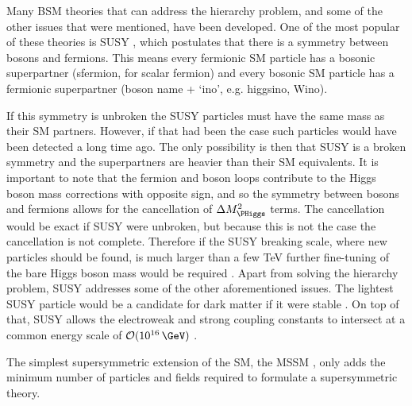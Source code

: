 Many \acf{BSM} theories that can address the hierarchy problem, and some of
the other issues that were mentioned, have been developed.
One of the most
popular of these theories is \acf{SUSY} \cite{SUSY-primer}, which postulates
that there is a symmetry between bosons and fermions. This means every fermionic
\ac{SM} particle has a bosonic superpartner (sfermion, for scalar fermion)
and every bosonic \ac{SM} particle
has a fermionic superpartner (boson name + `ino', e.g. higgsino, Wino).

If this symmetry is unbroken the \ac{SUSY} particles must
have the same mass as their \ac{SM} partners. However, if that had 
been the case such particles would have been detected a long time ago. The 
only possibility is then that \ac{SUSY} is a broken symmetry and the superpartners
are heavier than their \ac{SM} equivalents. It is important to note
that the fermion and boson loops contribute to the Higgs boson
mass corrections with opposite sign, and so the symmetry between bosons and fermions 
allows for the cancellation of $\Delta M_{\PHiggs}^2$ terms. The cancellation
would be exact if \ac{SUSY} were unbroken, but because this is not the case the
cancellation is not complete. Therefore if the \ac{SUSY} breaking scale, where
new particles should be found, is much larger than a few TeV further fine-tuning of
the bare Higgs boson mass would be required \cite{MSSM-carena-haber,SUSY-primer}.
Apart from solving the hierarchy problem, \ac{SUSY} addresses some
of the other aforementioned issues. The lightest \ac{SUSY} particle
would be a candidate for dark matter if it were stable \cite{SUSY-primer}. On top of that,
\ac{SUSY} allows the electroweak and strong coupling
constants to intersect at a common energy scale of $\mathcal{O}(10^{16}\,\GeV)$ \cite{GUT-LEP}. 

The simplest supersymmetric extension of the \ac{SM}, the \ac{MSSM} \cite{SUSY-primer}, only adds the minimum
number of particles and fields required to formulate a supersymmetric theory.

